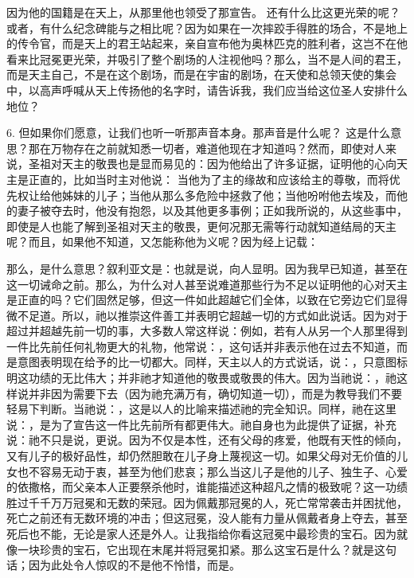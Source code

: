 因为他的国籍是在天上，从那里他也领受了那宣告。 还有什么比这更光荣的呢？或者，有什么纪念碑能与之相比呢？因为如果在一次摔跤手得胜的场合，不是地上的传令官，而是天上的君王站起来，亲自宣布他为奥林匹克的胜利者，这岂不在他看来比冠冕更光荣，并吸引了整个剧场的人注视他吗？那么，当不是人间的君王，而是天主自己，不是在这个剧场，而是在宇宙的剧场，在天使和总领天使的集会中，以高声呼喊从天上传扬他的名字时，请告诉我，我们应当给这位圣人安排什么地位？\par

6. 但如果你们愿意，让我们也听一听那声音本身。那声音是什么呢？ 这是什么意思？那在万物存在之前就知悉一切者，难道他现在才知道吗？然而，即使对人来说，圣祖对天主的敬畏也是显而易见的：因为他给出了许多证据，证明他的心向天主是正直的，比如当时主对他说： 当他为了主的缘故和应该给主的尊敬，而将优先权让给他姊妹的儿子；当他从那么多危险中拯救了他；当他吩咐他去埃及，而他的妻子被夺去时，他没有抱怨，以及其他更多事例；正如我所说的，从这些事中，即使是人也能了解到圣祖对天主的敬畏，更何况那无需等行动就知道结局的天主呢？而且，如果他不知道，又怎能称他为义呢？因为经上记载：\par

那么，是什么意思？叙利亚文是：也就是说，向人显明。因为我早已知道，甚至在这一切诫命之前。那么，为什么对人甚至说难道那些行为不足以证明他的心对天主是正直的吗？它们固然足够，但这一件如此超越它们全体，以致在它旁边它们显得微不足道。所以，祂以推崇这件善工并表明它超越一切的方式如此说话。因为对于超过并超越先前一切的事，大多数人常这样说：例如，若有人从另一个人那里得到一件比先前任何礼物更大的礼物，他常说：，这句话并非表示他在过去不知道，而是意图表明现在给予的比一切都大。同样，天主以人的方式说话，说：，只意图标明这功绩的无比伟大；并非祂才知道他的敬畏或敬畏的伟大。因为当祂说：，祂这样说并非因为需要下去（因为祂充满万有，确切知道一切），而是为教导我们不要轻易下判断。当祂说：，这是以人的比喻来描述祂的完全知识。同样，祂在这里说：，是为了宣告这一件比先前所有都更伟大。祂自身也为此提供了证据，补充说：祂不只是说，更说。因为不仅是本性，还有父母的疼爱，他既有天性的倾向，又有儿子的极好品性，却仍然胆敢在儿子身上蔑视这一切。如果父母对无价值的儿女也不容易无动于衷，甚至为他们悲哀；那么当这儿子是他的儿子、独生子、心爱的依撒格，而父亲本人正要祭杀他时，谁能描述这种超凡之情的极致呢？这一功绩胜过千千万万冠冕和无数的荣冠。因为佩戴那冠冕的人，死亡常常袭击并困扰他，死亡之前还有无数环境的冲击；但这冠冕，没人能有力量从佩戴者身上夺去，甚至死后也不能，无论是家人还是外人。让我指给你看这冠冕中最珍贵的宝石。因为就像一块珍贵的宝石，它出现在末尾并将冠冕扣紧。那么这宝石是什么？就是这句话；因为此处令人惊叹的不是他不怜惜，而是。\par

